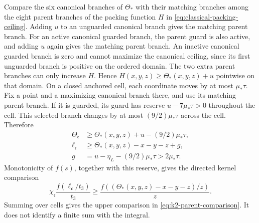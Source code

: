 Compare the six canonical branches of \(\Theta_*\) with their matching
branches among the eight parent branches of the packing function \(H\) in
\eqref{eq:classical-packing-ceiling}. Adding \(u\) to an unguarded canonical
branch gives the matching parent branch. For an active canonical guarded
branch, the parent guard is also active, and adding \(u\) again gives the
matching parent branch. An inactive canonical guarded branch is zero and
cannot maximize the canonical ceiling, since its first unguarded branch is
positive on the ordered domain. The two extra parent branches can only
increase \(H\). Hence
\(H(x,y,z)\ge\Theta_*(x,y,z)+u\) pointwise on that domain. On a closed
anchored cell, each coordinate moves by at most \(\mu_*\tau\). Fix a point
and a maximizing canonical branch there, and use its matching parent branch.
If it is guarded, its guard has reserve \(u-7\mu_*\tau>0\) throughout the
cell. This selected branch changes by at most \((9/2)\mu_*\tau\) across the
cell. Therefore
\begin{equation}\label{eq:k2-parent-reserve}
\begin{aligned}
 \Theta_{\mathfrak c}&\ge\Theta_*(x,y,z)+u-(9/2)\mu_*\tau,\\
 \ell_{\mathfrak c}&\ge\Theta_*(x,y,z)-x-y-z+g,\\
 g&=u-\eta_L-(9/2)\mu_*\tau>2\mu_*\tau.
\end{aligned}
\end{equation}
Monotonicity of \(f(s)\), together with this reserve,
gives the directed kernel comparison
\begin{equation}\label{eq:k2-parent-kernel}
 \chi_{\mathfrak c}\frac{f(\ell_{\mathfrak c}/t_3)}{t_3}
 \ge
 \frac{f((\Theta_*(x,y,z)-x-y-z)/z)}{z}.
\end{equation}
Summing over cells gives the upper comparison in
\eqref{eq:k2-parent-comparison}. It does not identify a finite sum with
the integral.


